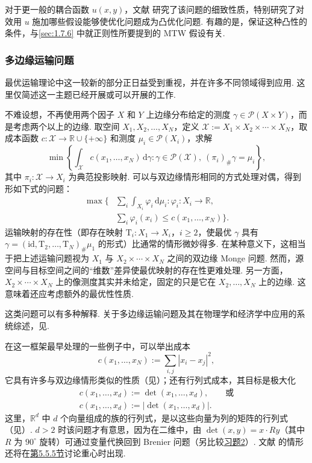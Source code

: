 \label{idx:i96-p48}
对于更一般的耦合函数 $u(x,y)$，文献\cite{b168} 研究了该问题的细致性质，特别研究了对效用 $u$ 施加哪些假设能够使优化问题成为凸优化问题. 有趣的是，保证这种凸性的条件，与\autoref{sec:1.7.6} 中就正则性所要提到的 MTW 假设有关.

\subsubsection{多边缘运输问题}\label{sec:1.7.4}

最优运输理论中这一较新的部分正日益受到重视，并在许多不同领域得到应用. 这里仅简述这一主题已经开展或可以开展的工作.

不难设想，不再使用两个因子 $X$ 和 $Y$ 上边缘分布给定的测度 $\gamma\in\mathscr P(X\times Y)$，而是考虑两个以上的边缘. 取空间 $X_1,X_2,\ldots,X_N$，定义 $\mathscr X:=X_1\times X_2\times\cdots\times X_N$，取成本函数 $c:\mathscr X\to\mathbb R\cup\{+\infty\}$ 和测度 $\mu_i\in\mathscr P(X_i)$，求解
\[
 \min\left\{\int_{\mathscr X}c(x_1,\ldots,x_N)\,\mathrm d\gamma:
       \gamma\in\mathscr P(\mathscr X),\ (\pi_i)_\#\gamma=\mu_i\right\},
\]
其中 $\pi_i:\mathscr X\to X_i$ 为典范投影映射. 可以与双边缘情形相同的方式处理对偶，得到形如下式的问题：
\begin{equation*}
\begin{aligned}
 \max\biggl\{&\sum_i\int_{X_i}\varphi_i\,\mathrm d\mu_i:
        \varphi_i:X_i\to\mathbb R,\\
       &\sum_i\varphi_i(x_i)\leq c(x_1,\ldots,x_N)\biggr\}.
\end{aligned}
\end{equation*}
运输映射的存在性（即存在映射 $\mathrm{T}_i:X_1\to X_i$，$i\geq2$，使最优 $\gamma$ 具有 $\gamma=(\mathrm{id},\mathrm{T}_2,\ldots,\mathrm{T}_N)_\#\mu_1$ 的形式）比通常的情形微妙得多. 在某种意义下，这相当于把上述运输问题视为 $X_1$ 与 $X_2\times\cdots\times X_N$ 之间的双边缘 Monge 问题. 然而，源空间与目标空间之间的“维数”差异使最优映射的存在性更难处理. 另一方面，$X_2\times\cdots\times X_N$ 上的像测度其实并未给定，固定的只是它在 $X_2,\ldots,X_N$ 上的边缘. 这意味着还应考虑额外的最优性性质.

这类问题可以有多种解释. 关于多边缘运输问题及其在物理学和经济学中应用的系统综述，见\cite{b249}.

在这一框架最早处理的一些例子中，可以举出成本
\[
 c(x_1,\ldots,x_N):=\sum_{i,j}|x_i-x_j|^2,
\]
它具有许多与双边缘情形类似的性质（见\cite{b177}）；还有行列式成本，其目标是极大化
\begin{equation*}
\begin{gathered}
 c(x_1,\ldots,x_d):=\det(x_1,\ldots,x_d),\qquad\text{或}\\
 c(x_1,\ldots,x_d):=|\det(x_1,\ldots,x_d)|.
\end{gathered}
\end{equation*}
这里，$\mathbb R^d$ 中 $d$ 个向量组成的族的行列式，是以这些向量为列的矩阵的行列式\mbox{（见\cite{b109}）.} $d>2$ 时该问题才有意思，因为在二维中，由 $\det(x,y)=x\cdot Ry$（其中 $R$ 为 $90^\circ$ 旋转）可通过变量代换回到 Brenier 问题（另比较\hyperref[ex:2]{习题2}）. 文献\cite{b177} 的情形还将在\hyperref[sec:5.5.5]{第5.5.5节}讨论重心时出现.

